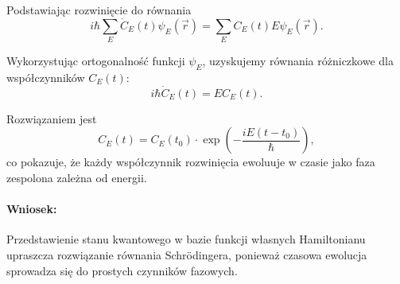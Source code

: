 Podstawiając rozwinięcie do równania
$$
i\hbar \sum_E \dot{C}_E(t) \psi_E(\vec{r}) = \sum_E C_E(t) E \psi_E(\vec{r}).
$$

Wykorzystując ortogonalność funkcji $\psi_E$, uzyskujemy równania różniczkowe dla współczynników $C_E(t)$:
$$
i\hbar \dot{C}_E(t) = E C_E(t).
$$

Rozwiązaniem jest
$$
C_E(t) = C_E(t_0) \cdot \exp\left(-\frac{i E (t - t_0)}{\hbar}\right),
$$
co pokazuje, że każdy współczynnik rozwinięcia ewoluuje w czasie jako faza zespolona zależna od energii.

\paragraph{Wniosek:} Przedstawienie stanu kwantowego w bazie funkcji własnych Hamiltonianu upraszcza rozwiązanie równania Schrödingera, ponieważ czasowa ewolucja sprowadza się do prostych czynników fazowych.
